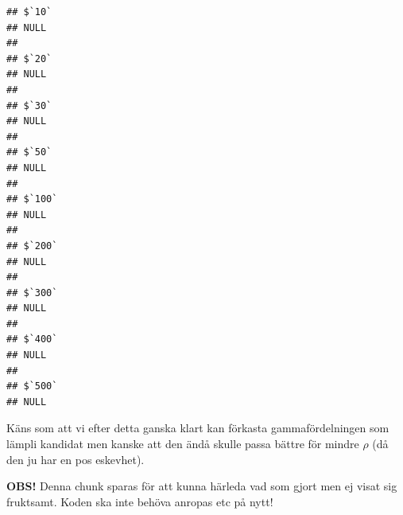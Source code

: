 \documentclass[]{article}
\newenvironment{Shaded}{\begin{snugshade}}{\end{snugshade}}
\newcommand{\KeywordTok}[1]{\textcolor[rgb]{0.13,0.29,0.53}{\textbf{{#1}}}}
\newcommand{\DataTypeTok}[1]{\textcolor[rgb]{0.13,0.29,0.53}{{#1}}}
\newcommand{\DecValTok}[1]{\textcolor[rgb]{0.00,0.00,0.81}{{#1}}}
\newcommand{\StringTok}[1]{\textcolor[rgb]{0.31,0.60,0.02}{{#1}}}
\newcommand{\NormalTok}[1]{{#1}}
\begin{document}
\begin{verbatim}
## $`10`
## NULL
## 
## $`20`
## NULL
## 
## $`30`
## NULL
## 
## $`50`
## NULL
## 
## $`100`
## NULL
## 
## $`200`
## NULL
## 
## $`300`
## NULL
## 
## $`400`
## NULL
## 
## $`500`
## NULL
\end{verbatim}

Käns som att vi efter detta ganska klart kan förkasta gammafördelningen
som lämpli kandidat men kanske att den ändå skulle passa bättre för
mindre \(\rho\) (då den ju har en pos eskevhet).

\textbf{OBS!} Denna chunk sparas för att kunna härleda vad som gjort men
ej visat sig fruktsamt. Koden ska inte behöva anropas etc på nytt!

\begin{Shaded}
\end{Shaded}
\end{document}
